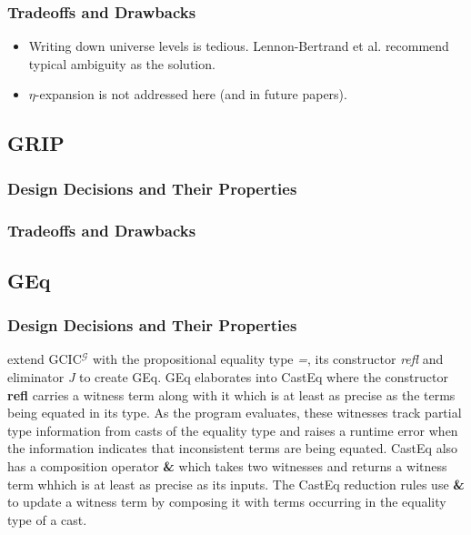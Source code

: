 \documentclass{article}
\theoremstyle{definition}
\newcommand{\Gcode}[1]{{\color{OliveGreen}\textit{#1}}}
\newcommand{\Ccode}[1]{{\color{BlueViolet}\textbf{#1}}}
\newcommand{\GCICG}[0]{GCIC\(^\mathcal{G}\)}
\begin{document}
\subsubsection{Tradeoffs and Drawbacks}
\begin{itemize}
  \item Writing down universe levels is tedious. Lennon-Bertrand et al.
    recommend typical ambiguity \cite{harper_type_1991} as the solution.
    \item \(\eta\)-expansion is not addressed here (and in future papers).
\end{itemize}
\subsection{GRIP}
\subsubsection{Design Decisions and Their Properties}
\subsubsection{Tradeoffs and Drawbacks}
\subsection{GEq}
\subsubsection{Design Decisions and Their Properties}
\citet{eremondi_propositional_2022} extend \GCICG{} with the propositional
equality type \Gcode{=}, its constructor \Gcode{refl} and eliminator \Gcode{J}
to create GEq. GEq elaborates into CastEq where the constructor \Ccode{refl}
carries a witness term along with it which is at least as precise as the terms
being equated in its type. As the program evaluates, these witnesses track
partial type information from casts of the equality type and raises a runtime
error when the information indicates that inconsistent terms are being equated.
CastEq also has a composition operator \Ccode{\&} which takes two witnesses and
returns a witness term whhich is at least as precise as its inputs. The CastEq
reduction rules use \Ccode{\&} to update a witness term by composing it with
terms occurring in the equality type of a cast.
\end{document}

